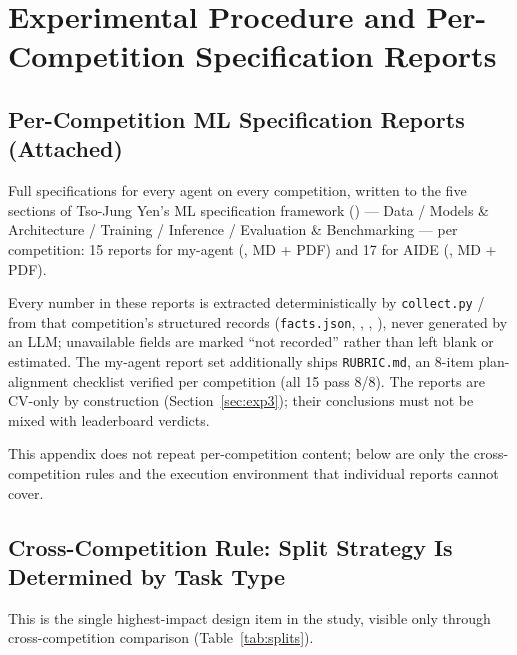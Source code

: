 \documentclass[11pt,a4paper]{article}
\begin{document}
\appendix

\section{Experimental Procedure and Per-Competition Specification Reports}
\label{app:specs}

\subsection{Per-Competition ML Specification Reports (Attached)}

Full specifications for every agent on every competition, written to the five sections of Tso-Jung Yen's ML specification framework () --- Data / Models \& Architecture / Training / Inference / Evaluation \& Benchmarking --- per competition: 15 reports for my-agent (\href{https://github.com/930731haohao-afk/kaggle-agent/tree/main/docs/ml_specs}{}, MD + PDF) and 17 for AIDE (\href{https://github.com/930731haohao-afk/kaggle-agent/tree/main/benchmark_results/ml_specs_aide}{}, MD + PDF).

Every number in these reports is extracted deterministically by \texttt{collect.py} /  from that competition's structured records (\texttt{facts.json}, , , ), never generated by an LLM; unavailable fields are marked ``not recorded'' rather than left blank or estimated. The my-agent report set additionally ships \texttt{RUBRIC.md}, an 8-item plan-alignment checklist verified per competition (all 15 pass 8/8). The reports are CV-only by construction (Section~\ref{sec:exp3}); their conclusions must not be mixed with leaderboard verdicts.

This appendix does not repeat per-competition content; below are only the cross-competition rules and the execution environment that individual reports cannot cover.

\subsection{Cross-Competition Rule: Split Strategy Is Determined by Task Type}

This is the single highest-impact design item in the study, visible only through cross-competition comparison (Table~\ref{tab:splits}).
\end{document}
